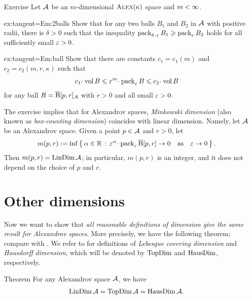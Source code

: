 \begin{thm}{Exercise}\label{ex:tangent=Em}
Let $\mathcal{A}$ be an $m$-dimensional $\textup{\textsc{Alex}}(\kappa)$ space and $m\z<\infty$.

\begin{subthm}{ex:tangent=Em:2balls}
Show that for any two balls $B_1$ and $B_2$ in $\mathcal{A}$ with positive radii,
there is $\delta>0$ such that the inequality
$\pack_{\delta\cdot\eps} B_1\ge \pack_\eps B_2$
holds for all sufficiently small $\varepsilon>0$.
\end{subthm}

\begin{subthm}{ex:tangent=Em:ball}
Show that there are constants $c_1=c_1(m)$ and $c_2=c_2(m,r,\kappa)$ such that
\[c_1\cdot \vol B\le\eps^m\cdot\pack_\eps B\le c_2\cdot \vol B\]
for any ball $B=\overline{\mathrm{B}}{}[p,r]_{\mathcal{A}}$ with $r>0$ and all small $\varepsilon>0$.
\end{subthm}

\end{thm}


The exercise implies that for Alexandrov spaces, \emph{Minkowski dimension} (also known as \emph{box-counting dimension}) coincides with linear dimension.
Namely, let $\mathcal{A}$ be an Alexandrov space.
Given a point $p\in \mathcal{A}$ and $r>0$, let
\[m(p,r)\df \inf\set{\alpha\in\RR}{\eps^\alpha\cdot\pack_\eps \cBall[p,r]\to 0\quad\text{as}\quad \eps\to 0}.\]
Then $m(p,r)=\mathop{\rm LinDim}\nolimits \mathcal{A}$; in particular, $m(p,r)$ is an integer, and it does not depend on the choice of $p$ and $r$.


\section{Other dimensions}\label{sec:all-dim}

Now we want to show that \textit{all reasonable definitions of dimension give the same result for Alexandrov spaces}.
More precisely, we have the following theorem; compare with \cite[15.16]{alexander-kapovitch-petrunin2024}.
We refer to \cite{hurewicz-wallman} for definitions of \emph{Lebesgue covering dimension} and \emph{Hausdorff dimension}, which will be denoted by $\mathop{\rm TopDim}\nolimits$ and
$\mathop{\rm HausDim}\nolimits$, respectively.

\begin{thm}{Theorem}\label{thm:dim=dim}
For any Alexandrov space $\mathcal{A}$, we have
\[\mathop{\rm LinDim}\nolimits \mathcal{A}=\mathop{\rm TopDim}\nolimits \mathcal{A}=\mathop{\rm HausDim}\nolimits \mathcal{A}.\]
\end{thm}

